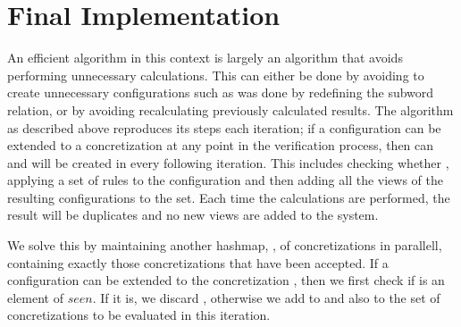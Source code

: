 

\newpage
\section{Final Implementation}
An efficient algorithm in this context is largely an algorithm that avoids performing unnecessary calculations. This can either be done by avoiding to create unnecessary configurations such as was done by redefining the subword relation, or by avoiding recalculating previously calculated results. The algorithm as described above reproduces its steps each iteration; if a configuration  can be extended to a concretization  at any point in the verification process, then  can and will be created in every following iteration. This includes checking whether , applying a set of rules to the configuration and then adding all the views of the resulting configurations to the set. Each time the calculations are performed, the result will be duplicates and no new views are added to the system.

We solve this by maintaining another hashmap, , of concretizations in parallell, containing exactly those concretizations that have been accepted. If a configuration  can be extended to the concretization , then we first check if  is an element of $seen$. If it is, we discard , otherwise we add  to  and also to the set of concretizations to be evaluated in this iteration.


